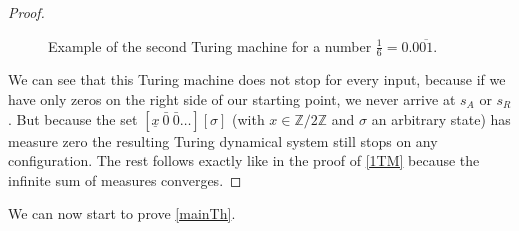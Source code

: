 \documentclass[12pt,a4paper]{scrartcl}
\theoremstyle{plain}
\theoremstyle{definition}
\newcommand{\2}{\mathbb{Z} / 2 \mathbb{Z}}
\newcommand{\1}{\bar{1}}
\newcommand{\0}{\bar{0}}
\begin{document}
\begin{proof}
\begin{figure}[]
		\caption{Example of the second Turing machine for a number $\frac{1}{6} = 0.0 \overline{01}$.}
		\label{Graphik_zweite_TM}
	\end{figure}
	
	We can see that this Turing machine does not stop for every input, because if we have only zeros on the right side of our starting point, we never arrive at $s_A$ or $s_R$. But because the set $[\underline{x} \ \0 \ \0 \ldots][\sigma]$ (with $x \in \2$ and $\sigma$ an arbitrary state) has measure zero the resulting Turing dynamical system still stops on any configuration. The rest follows exactly like in the proof of \ref{1TM} because the infinite sum of measures converges.
\end{proof}

We can now start to prove \ref{mainTh}.

\mainTh*
\end{document}
